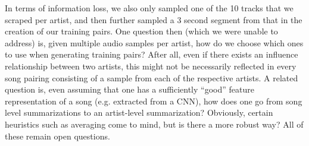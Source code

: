 In terms of information loss, we also only sampled one of the 10 tracks that we scraped per artist, and then further sampled a 3 second segment from that in the creation of our training pairs. One question then (which we were unable to address) is, given multiple audio samples per artist, how do we choose which ones to use when generating training pairs? After all, even if there exists an influence relationship between two artists, this might not be necessarily reflected in every song pairing consisting of a sample from each of the respective artists. A related question is, even assuming that one has a sufficiently ``good'' feature representation of a song (e.g. extracted from a CNN), how does one go from song level summarizations to an artist-level summarization? Obviously, certain heuristics such as averaging come to mind, but is there a more robust way? All of these remain open questions.
